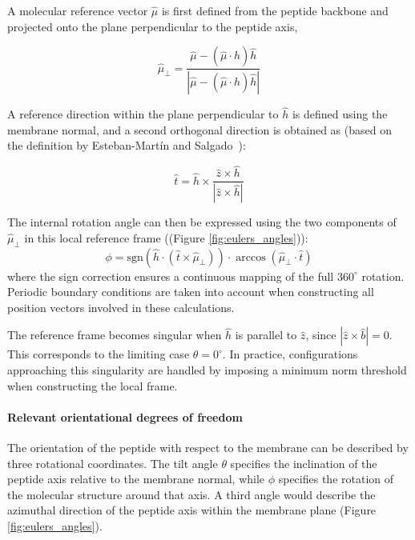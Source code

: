 A molecular reference vector $\hat{\mu}$ is first defined from the peptide backbone and projected onto the plane perpendicular to the peptide axis,

\begin{equation}
\hat{\mu}_{\perp} = \frac{ \hat{\mu}-(\hat{\mu}\cdot\hat{h})\hat{h} }{ \left| \hat{\mu}-(\hat{\mu}\cdot\hat{h})\hat{h} \right| }
\end{equation}

A reference direction within the plane perpendicular to $\hat{h}$ is defined using the membrane normal, and a second orthogonal direction is obtained as (based on the definition by Esteban-Martín and Salgado~\cite{ESTEBANMARTIN20074278}):


\begin{equation}
\hat{t} = \hat{h}\times \frac{ \hat{z}\times\hat{h} }{ |\hat{z}\times\hat{h}| }
\end{equation}


The internal rotation angle can then be expressed using the two components of $\hat{\mu}_{\perp}$ in this local reference frame ((Figure \ref{fig:eulers_angles})):
 \begin{equation}
\phi = \mathrm{sgn}\left( \hat{h} \cdot (\hat{t} \times \hat{\mu}_\perp) \right) \cdot \arccos\left( \hat{\mu}_\perp \cdot \hat{t} \right)
\end{equation}
where the sign correction ensures a continuous mapping of the full $360^\circ$ rotation. Periodic boundary conditions are taken into account when constructing all position vectors involved in these calculations.

The reference frame becomes singular when $\hat{h}$ is parallel to $\hat{z}$, since $|\hat{z}\times\hat{b}|=0$. This corresponds to the limiting case $\theta=0^\circ$. In practice, configurations approaching this singularity are handled by imposing a minimum norm threshold when constructing the local frame.

\paragraph{Relevant orientational degrees of freedom}

The orientation of the peptide with respect to the membrane can be described by three rotational coordinates. The tilt angle $\theta$ specifies the inclination of the peptide axis relative to the membrane normal, while $\phi$ specifies the rotation of the molecular structure around that axis. A third angle would describe the azimuthal direction of the peptide axis within the membrane plane (Figure \ref{fig:eulers_angles}).

